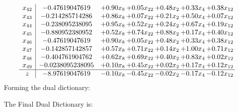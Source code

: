 \documentclass[8pt]{article}
\begin{document}
\[\begin{array}{c| c c@{\hskip 2pt} c@{\hskip 2pt} c@{\hskip 2pt} c@{\hskip 2pt} c@{\hskip 2pt} }
 x_{42}   &  -0.47619047619 & +  0.90 x_{8} & +  0.05 x_{22} & +  0.48 x_{2} & +  0.33 x_{4} & +  0.38 x_{12}\\
 x_{43}   &  -0.214285714286 & +  0.86 x_{8} & +  0.07 x_{22} & +  0.21 x_{2} & +  0.50 x_{4} & +  0.07 x_{12}\\
 x_{44}   &  -0.238095238095 & +  0.95 x_{8} & +  0.52 x_{22} & +  0.24 x_{2} & +  0.67 x_{4} & +  0.19 x_{12}\\
 x_{45}   &  -0.880952380952 & +  0.52 x_{8} & +  0.74 x_{22} & +  0.88 x_{2} & +  0.17 x_{4} & +  0.40 x_{12}\\
 x_{46}   &  -0.47619047619 & +  0.90 x_{8} & +  0.05 x_{22} & +  0.48 x_{2} & +  0.33 x_{4} & +  0.38 x_{12}\\
 x_{47}   &  -0.142857142857 & +  0.57 x_{8} & +  0.71 x_{22} & +  0.14 x_{2} & +  1.00 x_{4} & +  0.71 x_{12}\\
 x_{48}   &  -0.404761904762 & +  0.62 x_{8} & +  0.69 x_{22} & +  0.40 x_{2} & +  0.83 x_{4} & +  0.02 x_{12}\\
 x_{49}   &  -0.0238095238095 & +  0.10 x_{8} & +  0.45 x_{22} & +  0.02 x_{2} & +  0.17 x_{4} & +  0.12 x_{12}\\
\hline
z    &  -8.97619047619 & -0.10 x_{8} & -0.45 x_{22} & -0.02 x_{2} & -0.17 x_{4} & -0.12 x_{12}\\
\end{array}\]
Forming the dual dictionary:

The Final Dual Dictionary is: 
\end{document}
